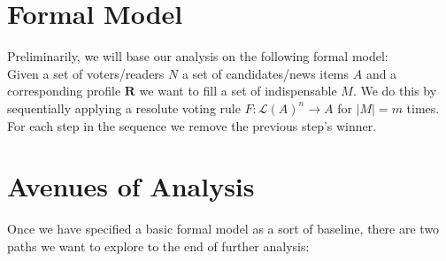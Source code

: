 \documentclass[10pt,a4paper, english]{article}
\begin{document}
\section{Formal Model}
Preliminarily, we will base our analysis on the following formal model:\\
Given a set of voters/readers $N$ a set of candidates/news items $A$ and a corresponding profile $\mathbf{R}$ we want to fill a set of indispensable $M$. We do this by sequentially applying a resolute voting rule $F:\mathcal{L}(A)^n \rightarrow A$ for $|M|=m$ times. For each step in the sequence we remove the previous step's winner.

\section{Avenues of Analysis} 
Once we have specified a basic formal model as a sort of baseline, there are two paths we want to explore to the end of further analysis:
\end{document}
